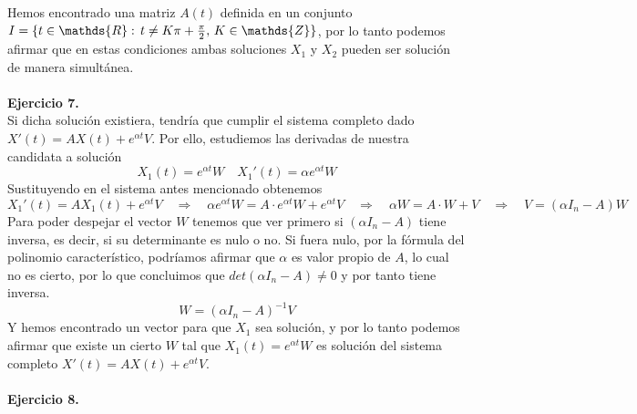 \documentclass[fleqn]{article}
\def\R{\mathds{R}}
\def\Z{\mathds{Z}}
\def\next{\quad \Rightarrow \quad}
\begin{document}
    Hemos encontrado una matriz $A(t)$ definida en un conjunto $I=\{t\in \R: \thinspace t\neq K\pi + \frac{\pi}{2}, \thinspace K\in\Z\}$, por lo tanto podemos afirmar 
    que en estas condiciones ambas soluciones $X_1$ y $X_2$ pueden ser solución de manera simultánea.\\ \\

    \textbf{Ejercicio 7. } \\

    Si dicha solución existiera, tendría que cumplir el sistema completo dado $X'(t) = AX(t) + e^{\alpha t}V$. Por ello, estudiemos las derivadas de nuestra candidata a solución
    $$X_1(t) = e^{\alpha t}W \quad X_1'(t) = \alpha e^{\alpha t}W$$
    Sustituyendo en el sistema antes mencionado obtenemos
    $$X_1'(t) = AX_1(t) + e^{\alpha t}V  \next  \alpha e^{\alpha t}W = A \cdot e^{\alpha t}W + e^{\alpha t}V  \next  \alpha W = A\cdot W + V  \next V = (\alpha I_n -A) W$$
    Para poder despejar el vector $W$ tenemos que ver primero si $(\alpha I_n -A)$ tiene inversa, es decir, si su determinante es nulo o no. Si fuera nulo, por la fórmula del polinomio 
    característico, podríamos afirmar que $\alpha$ es valor propio de $A$, lo cual no es cierto, por lo que concluimos que $det(\alpha I_n -A)\neq 0$ y por tanto tiene inversa. 
    $$ W = (\alpha I_n -A)^{-1} V $$
    Y hemos encontrado un vector para que $X_1$ sea solución, y por lo tanto podemos afirmar que existe un cierto $W$ tal que $X_1(t) = e^{\alpha t}W$ es solución del sistema completo
    $X'(t) = AX(t) + e^{\alpha t}V$.\\ \\

    \textbf{Ejercicio 8. } \\
\end{document}
